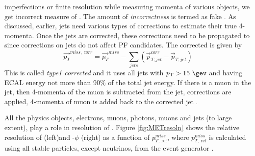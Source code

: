 imperfections or finite resolution while measuring momenta of various objects, we get incorrect measure of \ptmiss. The amount of 
\textit{incorrectness} is termed as fake \ptmiss. As discussed, earlier, jets need various types of corrections to estimate their true 
4-momenta. Once the jets are corrected, these corrections need to be propagated to \ptmiss since corrections on jets do not affect PF 
candidates. The corrected \ptmiss is given by
\begin{equation}
\vec{p_{T}}^{miss,\ corr} = \vec{p_{T}}^{miss} - \sum_{jets}^{}(\vec{p}_{T,jet}^{corr} - \vec{p}_{T,jet}) 
\end{equation}
This \ptmiss is called \textit{type1 corrected \ptmiss} and it uses all jets with $\pt > 15\ \gev$ and having ECAL energy not more than 
90\% of the total jet energy. If there is a muon in the jet, then 4-momenta of the muon is subtracted from the jet, corrections are 
applied, 4-momenta of muon is added back to the corrected jet \cite{CMS-PAS-JME-16-004}.

All the physics objects, electrons, muons, photons, muons and jets (to large extent), play a role in resolution of \ptmiss. Figure 
\ref{fig:METresoln} shows the relative resolution of \ptmiss (left)and \ptmiss-$\phi$ (right) as a function of $p_{T,\ 
\mathrm{ref}}^{miss}$, where $p_{T,\ \mathrm{ref}}^{miss}$ is calculated using all stable particles, except neutrinos, from the event 
generator \cite{CMS-PRF-14-001}.